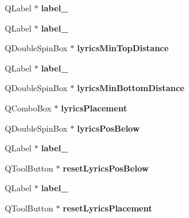 \begin{DoxyCompactItemize}
Q\+Label $\ast$ {\bfseries label\+\_}
\item 
\mbox{\label{class_ui___edit_style_base_ac5c37c90543dcd674431f69c0672e08c}} 
Q\+Label $\ast$ {\bfseries label\+\_}
\item 
\mbox{\label{class_ui___edit_style_base_a0267a0b932a062ec5e2c096f55658901}} 
Q\+Double\+Spin\+Box $\ast$ {\bfseries lyrics\+Min\+Top\+Distance}
\item 
\mbox{\label{class_ui___edit_style_base_a64b67c7fd341f482f9719c3aa6cb0621}} 
Q\+Label $\ast$ {\bfseries label\+\_}
\item 
\mbox{\label{class_ui___edit_style_base_a6f80aef2033b2e68552897066caa0671}} 
Q\+Double\+Spin\+Box $\ast$ {\bfseries lyrics\+Min\+Bottom\+Distance}
\item 
\mbox{\label{class_ui___edit_style_base_a2255c338af229de2078a52207dc45ede}} 
Q\+Combo\+Box $\ast$ {\bfseries lyrics\+Placement}
\item 
\mbox{\label{class_ui___edit_style_base_aaaf0db64e849f5e027ebc3deb0b95763}} 
Q\+Double\+Spin\+Box $\ast$ {\bfseries lyrics\+Pos\+Below}
\item 
\mbox{\label{class_ui___edit_style_base_a198556847b489699243e8b070d2fafb6}} 
Q\+Label $\ast$ {\bfseries label\+\_}
\item 
\mbox{\label{class_ui___edit_style_base_a35be3ede455785c290c5beb7d21e58dc}} 
Q\+Tool\+Button $\ast$ {\bfseries reset\+Lyrics\+Pos\+Below}
\item 
\mbox{\label{class_ui___edit_style_base_aad3a275d3d24006ef7a477f28181c90b}} 
Q\+Label $\ast$ {\bfseries label\+\_}
\item 
\mbox{\label{class_ui___edit_style_base_a9d885e09974fddfca251896826203b20}} 
Q\+Tool\+Button $\ast$ {\bfseries reset\+Lyrics\+Placement}
\item 

\end{DoxyCompactItemize}

